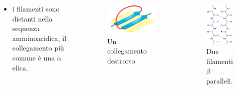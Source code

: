 \documentclass{beamer}
\begin{document}
\begin{frame}
\begin{columns}
\begin{itemize}
\begin{itemize}
\pause   \item i filamenti sono distanti nella sequenza amminoacidica, il collegamento più comune è una $\alpha$ elica.
\end{itemize} \end{itemize}
\begin{figure}\includegraphics[scale=0.35]{betasheet-parallel.png}\caption{Un collegamento destrorso.}\end{figure}

\begin{figure}\includegraphics[scale=0.35]{beta_sheet_parallel.png}\caption{Due filamenti $\beta$ paralleli.}\end{figure}  \end{columns}
\end{frame}
\end{document}
